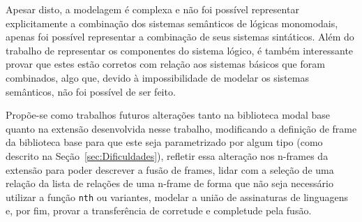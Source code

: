 	Apesar disto, a modelagem é complexa e não foi possível representar explicitamente a combinação dos sistemas semânticos de lógicas monomodais, apenas foi possível representar a
	combinação de seus sistemas sintáticos. Além do trabalho de representar os componentes do sistema lógico, é também interessante provar que estes estão corretos com relação aos
	sistemas básicos que foram combinados, algo que, devido à impossibilidade de modelar os sistemas semânticos, não foi possível de ser feito.

	Propõe-se como trabalhos futuros alterações tanto na biblioteca modal base quanto na extensão desenvolvida nesse trabalho, modificando a definição de
	frame da biblioteca base para que este seja parametrizado por algum tipo (como descrito na Seção~\ref{sec:Dificuldades}), refletir essa alteração nos n-frames da extensão
	para poder descrever a fusão de frames, lidar com a seleção de uma relação da lista de relações de uma n-frame de forma que não seja necessário utilizar a função
	\texttt{nth} ou variantes, modelar a união de assinaturas de linguagens e, por fim, provar a transferência de corretude e completude pela fusão.





